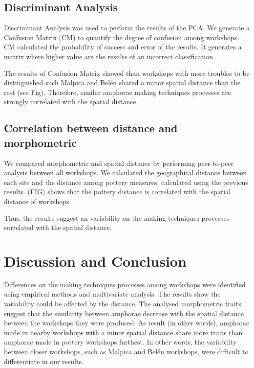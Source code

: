 \documentclass[review]{elsarticle}
\begin{document}
\subsection{Discriminant Analysis}


Discriminant Analysis was used to perform the results of the PCA. We generate a Confusion Matrix (CM) to quantify the degree of confusion among workshops. CM calculated the probability of success and error of the results. It generates a matrix where higher value are the results of an incorrect classification. 

The results of Confusion Matrix showed than workshops with more troubles to be distinguished such Malpica and Bel\'en shared a minor spatial distance than the rest (see Fig). Therefore, similar amphorae making techniques processes are strongly correlated with the spatial distance. 




\subsection{Correlation between distance and morphometric}

We compared morphometric and spatial distance by performing peer-to-peer analysis between all workshops. We calculated the geographical distance between each site and the distance among pottery measures, calculated using the previous results. (FIG) shows that the pottery distance is correlated with the spatial distance of workshops.




Thus, the results suggest an variability on the making-techniques procceses correlated with the spatial distance. 

\section{Discussion and Conclusion}

Differences on the making techniques processes among workshops were identified using empirical methods and  multivariate analysis. The results show the variability could be affected by the distance. The analysed morphometric traits suggest that the similarity between amphorae decrease with the spatial distance between the workshops they were produced. As result (in other words), amphorae made in nearby workshops with a minor spatial distance share more traits than amphorae made in pottery workshops furthest. In other words, the variability between closer workshops, such as Malpica and Bel\'en workshops, were difficult to differentiate in our results.  
\end{document}
